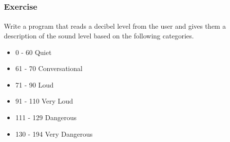 \documentclass[]{beamer}
\begin{document}
\begin{frame}
  \frametitle{Exercise}
  \framesubtitle{}

Write a program that reads a decibel level from the user
and gives them a description of the sound level based on
the following categories.

\begin{itemize}
  \item 0 - 60 Quiet
  \item 61 - 70 Conversational
  \item 71 - 90 Loud
  \item 91 - 110 Very Loud
  \item 111 - 129 Dangerous
  \item 130 - 194 Very Dangerous
\end{itemize}

\end{frame}
\end{document}
